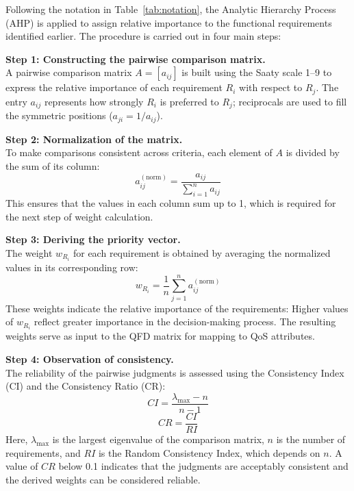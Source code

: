 \documentclass[twocolumn]{svjour3}
\begin{document}
Following the notation in Table~\ref{tab:notation}, the Analytic Hierarchy Process (AHP) is applied to assign relative importance to the functional requirements identified earlier. The procedure is carried out in four main steps:

\textbf{Step 1: Constructing the pairwise comparison matrix.} \\
A pairwise comparison matrix $A = [a_{ij}]$ is built using the Saaty scale 1–9 to express the relative importance of each requirement $R_i$ with respect to $R_j$. The entry $a_{ij}$ represents how strongly $R_i$ is preferred to $R_j$; reciprocals are used to fill the symmetric positions ($a_{ji} = 1/a_{ij}$).

\textbf{Step 2: Normalization of the matrix.} \\
To make comparisons consistent across criteria, each element of $A$ is divided by the sum of its column:
\begin{equation}
a_{ij}^{(\text{norm})} = \frac{a_{ij}}{\sum_{i=1}^{n} a_{ij}}
\label{eq:norm_matrix}
\end{equation}
This ensures that the values in each column sum up to 1, which is required for the next step of weight calculation.

\textbf{Step 3: Deriving the priority vector.} \\
The weight $w_{R_i}$ for each requirement is obtained by averaging the normalized values in its corresponding row:
\begin{equation}
w_{R_i} = \frac{1}{n} \sum_{j=1}^{n} a_{ij}^{(\text{norm})}
\label{eq:priority_vector}
\end{equation}
These weights indicate the relative importance of the requirements: Higher values of $w_{R_i}$ reflect greater importance in the decision-making process. The resulting weights serve as input to the QFD matrix for mapping to QoS attributes.

\textbf{Step 4: Observation of consistency.} \\
The reliability of the pairwise judgments is assessed using the Consistency Index (CI) and the Consistency Ratio (CR):
\begin{equation}
CI = \frac{\lambda_{\max} - n}{n - 1}
\label{eq:ci}
\end{equation}
\begin{equation}
CR = \frac{CI}{RI}
\label{eq:cr}
\end{equation}
Here, $\lambda_{\max}$ is the largest eigenvalue of the comparison matrix, $n$ is the number of requirements, and $RI$ is the Random Consistency Index, which depends on $n$. A value of $CR$ below 0.1 indicates that the judgments are acceptably consistent and the derived weights can be considered reliable.
\end{document}
